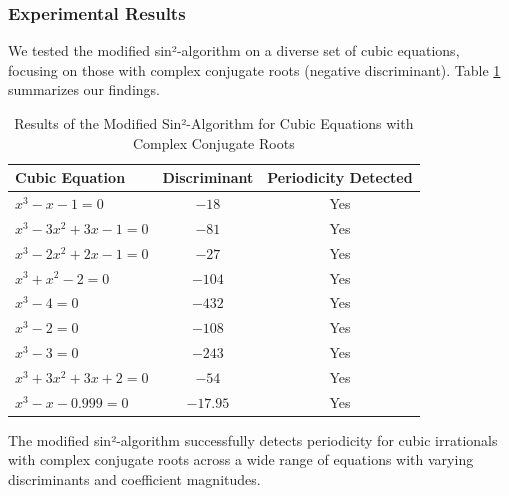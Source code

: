 \subsubsection{Experimental Results}

We tested the modified sin²-algorithm on a diverse set of cubic equations, focusing on those with complex conjugate roots (negative discriminant). Table \ref{tab:subtractive_results} summarizes our findings.

\begin{table}[h]
\centering
\caption{Results of the Modified Sin²-Algorithm for Cubic Equations with Complex Conjugate Roots}
\label{tab:subtractive_results}
\begin{tabular}{|p{4cm}|c|c|}
\hline
\textbf{Cubic Equation} & \textbf{Discriminant} & \textbf{Periodicity Detected} \\
\hline
$x^3 - x - 1 = 0$ & $-18$ & Yes \\
$x^3 - 3x^2 + 3x - 1 = 0$ & $-81$ & Yes \\
$x^3 - 2x^2 + 2x - 1 = 0$ & $-27$ & Yes \\
$x^3 + x^2 - 2 = 0$ & $-104$ & Yes \\
$x^3 - 4 = 0$ & $-432$ & Yes \\
$x^3 - 2 = 0$ & $-108$ & Yes \\
$x^3 - 3 = 0$ & $-243$ & Yes \\
$x^3 + 3x^2 + 3x + 2 = 0$ & $-54$ & Yes \\
$x^3 - x - 0.999 = 0$ & $-17.95$ & Yes \\
\hline
\end{tabular}
\end{table}

\begin{proposition}
The modified sin²-algorithm successfully detects periodicity for cubic irrationals with complex conjugate roots across a wide range of equations with varying discriminants and coefficient magnitudes.
\end{proposition}

